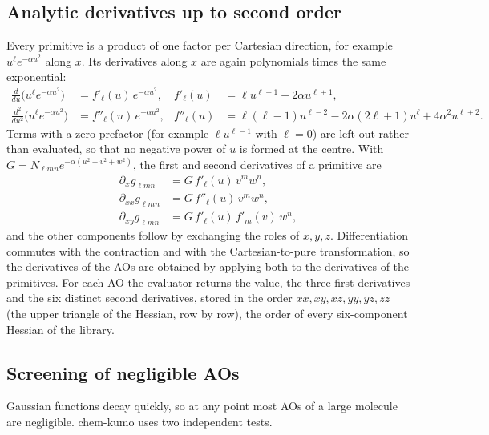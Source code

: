 \documentclass[11pt,a4paper]{article}
\begin{document}
\subsection{Analytic derivatives up to second order}
Every primitive is a product of one factor per Cartesian direction, for
example $u^\ell e^{-\alpha u^2}$ along $x$. Its derivatives along $x$ are
again polynomials times the same exponential:
\begin{align}
 \frac{d}{du}\big(u^\ell e^{-\alpha u^2}\big)&=f'_\ell(u)\,e^{-\alpha u^2},&
 f'_\ell(u)&=\ell u^{\ell-1}-2\alpha u^{\ell+1},\\
 \frac{d^2}{du^2}\big(u^\ell e^{-\alpha u^2}\big)&=f''_\ell(u)\,e^{-\alpha u^2},&
 f''_\ell(u)&=\ell(\ell-1)u^{\ell-2}-2\alpha(2\ell+1)u^\ell+4\alpha^2u^{\ell+2}.
\end{align}
Terms with a zero prefactor (for example $\ell u^{\ell-1}$ with $\ell=0$)
are left out rather than evaluated, so that no negative power of $u$ is
formed at the centre. With
$G=N_{\ell mn}e^{-\alpha(u^2+v^2+w^2)}$, the first and second derivatives
of a primitive are
\begin{align}
 \partial_x g_{\ell mn}&=G\,f'_\ell(u)\,v^m w^n,\\
 \partial_{xx}g_{\ell mn}&=G\,f''_\ell(u)\,v^m w^n,\\
 \partial_{xy}g_{\ell mn}&=G\,f'_\ell(u)\,f'_m(v)\,w^n,
\end{align}
and the other components follow by exchanging the roles of $x,y,z$.
Differentiation commutes with the contraction and with the
Cartesian-to-pure transformation, so the derivatives of the AOs are
obtained by applying both to the derivatives of the primitives. For each AO
the evaluator returns the value, the three first derivatives and the six
distinct second derivatives, stored in the order $xx,xy,xz,yy,yz,zz$ (the
upper triangle of the Hessian, row by row), the order of every
six-component Hessian of the library.

\subsection{Screening of negligible AOs}\label{sec:screening}
Gaussian functions decay quickly, so at any point most AOs of a large
molecule are negligible. chem-kumo uses two independent tests.
\end{document}
